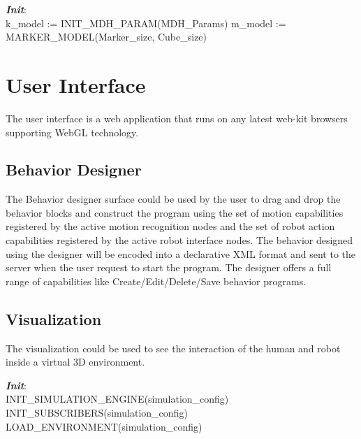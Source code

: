 \begin{algorithm}
 \textbf{\emph{Init}}:\\
 k\_model := INIT\_MDH\_PARAM(MDH\_Params)\;
 m\_model := MARKER\_MODEL(Marker\_size, Cube\_size)\;
\end{algorithm}


\section{User Interface}
\label{ssec:ui_comp}
The user interface is a web application that runs on any latest web-kit browsers supporting WebGL technology. 

\subsection{Behavior Designer} The Behavior designer surface could be used by the user to drag and drop the behavior blocks and construct the program using the set of motion capabilities registered by the active motion recognition nodes and the set of robot action capabilities registered by the active robot interface nodes. The behavior designed using the designer will be encoded into a declarative XML format and sent to the server when the user request to start the program. The designer offers a full range of capabilities like Create/Edit/Delete/Save behavior programs.
\subsection{Visualization} The visualization could be used to see the interaction of the human and robot inside a virtual 3D environment.
\begin{algorithm}
 \textbf{\emph{Init}}:\\
 \quad INIT\_SIMULATION\_ENGINE(simulation\_config) \;
 \quad INIT\_SUBSCRIBERS(simulation\_config) \;
 \quad LOAD\_ENVIRONMENT(simulation\_config) \; 
\end{algorithm}


